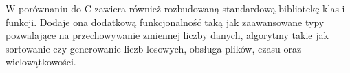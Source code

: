 W porównaniu do C zawiera również rozbudowaną standardową bibliotekę klas i funkcji.
Dodaje ona dodatkową funkcjonalność taką jak zaawansowane typy pozwalające na
przechowywanie zmiennej liczby danych, algorytmy takie jak sortowanie czy 
generowanie liczb losowych, obsługa plików, czasu oraz wielowątkowości.

